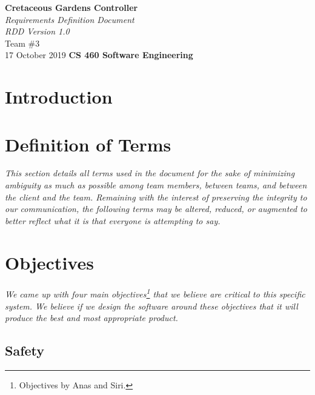 \documentclass[12pt]{article}
\begin{document}
\begin{titlepage}
\begin{flushleft}
\vspace*{1cm}
\Huge
\textbf{Cretaceous Gardens Controller}\\
\vspace{1cm}
\Huge
\textit{Requirements Definition Document}\\
\vspace{1cm}
\Large
\textit{RDD Version 1.0}\\
\vspace{5cm}
\LARGE
Team \#3\\
17 October 2019
\vfill
\Huge
\textbf{CS 460 Software Engineering}
\end{flushleft}
\end{titlepage}
\normalsize
\tableofcontents
\newpage
\section{Introduction} %

\section{Definition of Terms} %
\label{def}
\textit{This section details all terms used in the document for the sake of minimizing ambiguity as much as possible among team members, between teams, and between the client and the team. Remaining with the interest of preserving the integrity to our communication, the following terms may be altered, reduced, or augmented to better reflect what it is that everyone is attempting to say.}
\pagebreak
	

\section{Objectives} 
\label{obj}
\paragraph{} \textit{We came up with four main objectives\footnote{Objectives by Anas and Siri.} that we believe are critical to this specific system. We believe if we design the software around these objectives that it will produce the best  and most appropriate product.}
\subsection{Safety}\label{saf}
\end{document}
